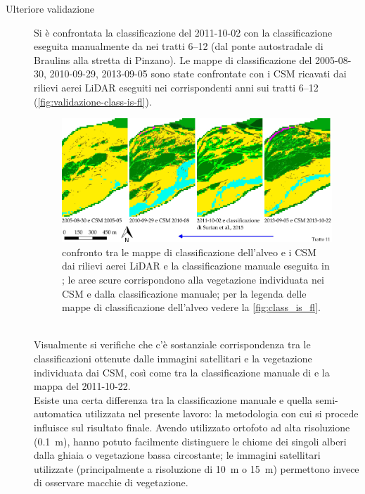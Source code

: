 \begin{description}
\begin{figure}
	\end{figure}
	\item[Ulteriore validazione] Si è confrontata la classificazione del 2011-10-02 con la classificazione eseguita manualmente da \cite{Surian:2015} nei tratti \numrange[range-phrase={$\div$}]{6}{12} (dal ponte autostradale di Braulins alla stretta di Pinzano).
	Le mappe di classificazione del 2005-08-30, 2010-09-29, 2013-09-05 sono state confrontate con i CSM ricavati dai rilievi aerei LiDAR eseguiti nei corrispondenti anni sui tratti \numrange[range-phrase={$\div$}]{6}{12} (\vref{fig:validazione-class-is-fl}).
	\begin{figure}
		\centering
		\includegraphics[width=\textwidth]{files/Class_mia_vs_surian_csm.jpeg}
		\caption[validazione della classificazione dell'alveo]{confronto tra le mappe di classificazione dell'alveo e i CSM dai rilievi aerei LiDAR e la classificazione manuale eseguita in \cite{Surian:2015}; le aree scure corrispondono alla vegetazione individuata nei CSM e dalla classificazione manuale; per la legenda delle mappe di classificazione dell'alveo vedere la \vref{fig:class_is_fl}.}
		\label{fig:validazione-class-is-fl}
	\end{figure}
	\\
	Visualmente si verifiche che c'è sostanziale corrispondenza tra le classificazioni ottenute dalle immagini satellitari e la vegetazione individuata dai CSM, così come tra la classificazione manuale di \cite{Surian:2015} e la mappa del 2011-10-22.
	\\
	Esiste una certa differenza tra la classificazione manuale e quella semi-automatica utilizzata nel presente lavoro: la metodologia con cui si procede influisce sul risultato finale.
	Avendo \cite{Surian:2015} utilizzato ortofoto ad alta risoluzione (\SI{0.1}{\m}), hanno potuto facilmente distinguere le chiome dei singoli alberi dalla ghiaia o vegetazione bassa circostante; le immagini satellitari utilizzate (principalmente a risoluzione di \SI{10}{\m} o \SI{15}{\m}) permettono invece di osservare macchie di vegetazione.

\end{description}
